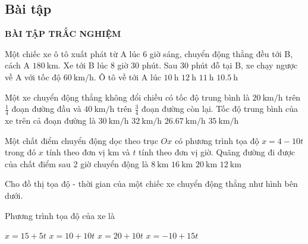 \subsection{Bài tập}
\setcounter{ex}{0}
\textbf{BÀI TẬP TRẮC NGHIỆM}
\begin{ex}
	Một chiếc xe ô tô xuất phát từ A lúc 6 giờ sáng, chuyển động thẳng đều tới B, cách A $\SI{180}{\kilo\meter}$. Xe tới B lúc 8 giờ 30 phút. Sau 30 phút đỗ tại B, xe chạy ngược về A với tốc độ $\SI{60}{\kilo\meter/\hour}$. Ô tô về tới A lúc
	\choice
	{$\SI{10}{\hour}$}
	{\True $\SI{12}{\hour}$}
	{$\SI{11}{\hour}$}
	{$\SI{10.5}{\hour}$}
	\loigiai{}
\end{ex}
\begin{ex}
	Một xe chuyển động thẳng không đổi chiều có tốc độ trung bình là $\SI{20}{\kilo\meter/\hour}$ trên  $\frac{1}{4}$ đoạn đường đầu và $\SI{40}{\kilo\meter/\hour}$ trên $\frac{3}{4}$ đoạn đường còn lại. Tốc độ trung bình của xe trên cả đoạn đường là 	
	\choice
	{$\SI{30}{\kilo\meter/\hour}$}
	{\True $\SI{32}{\kilo\meter/\hour}$}
	{$\SI{26.67}{\kilo\meter/\hour}$}
	{$\SI{35}{\kilo\meter/\hour}$}
	\loigiai{}
\end{ex}
\begin{ex}
	Một chất điểm chuyển động dọc theo trục $Ox$ có phương trình tọa độ $x=4-10t$ trong đó $x$ tính theo đơn vị $\si{\kilo\meter}$ và $t$ tính theo đơn vị giờ. Quãng đường đi được của chất điểm sau 2 giờ chuyển động là
	\choice
	{$\SI{8}{\kilo\meter}$}
	{$\SI{16}{\kilo\meter}$}
	{\True $\SI{20}{\kilo\meter}$}
	{$\SI{12}{\kilo\meter}$}
	\loigiai{}
\end{ex}
\begin{ex}
	Cho đồ thị tọa độ - thời gian của một chiếc xe chuyển động thẳng như hình bên dưới. 
	\begin{center}
	\end{center}
	Phương trình tọa độ của xe là
	
	\choice
	{$x=15+5t$}
	{\True $x=10+10t$}
	{$x=20+10t$}
	{$x=-10+15t$}
	\loigiai{}
\end{ex}
